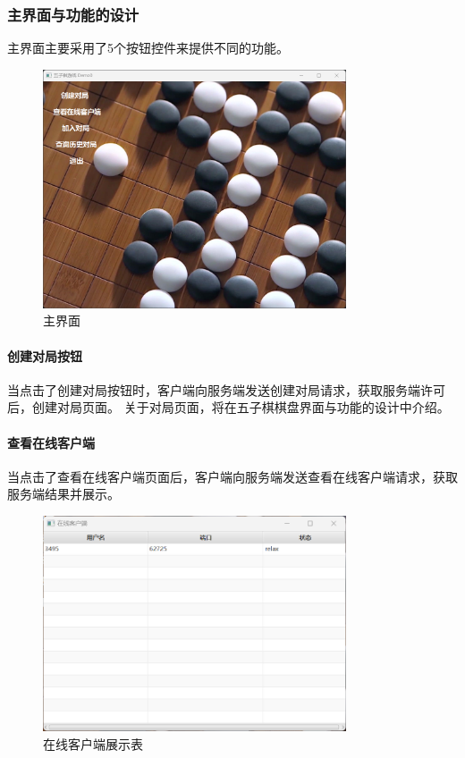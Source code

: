 \documentclass[utf8]{article}
\begin{document}
\subsubsection{主界面与功能的设计}
主界面主要采用了5个按钮控件来提供不同的功能。
\begin{figure}[H]
    \centering
    \includegraphics[width=0.8\textwidth]{pictures/7}
    \caption{主界面}
\end{figure}
\paragraph{创建对局按钮}
当点击了创建对局按钮时，客户端向服务端发送创建对局请求，获取服务端许可后，创建对局页面。
关于对局页面，将在五子棋棋盘界面与功能的设计中介绍。
\paragraph{查看在线客户端}
当点击了查看在线客户端页面后，客户端向服务端发送查看在线客户端请求，获取服务端结果并展示。
\begin{figure}[H]
    \centering
    \includegraphics[width=0.8\textwidth]{pictures/8}
    \caption{在线客户端展示表}
\end{figure}
\end{document}
